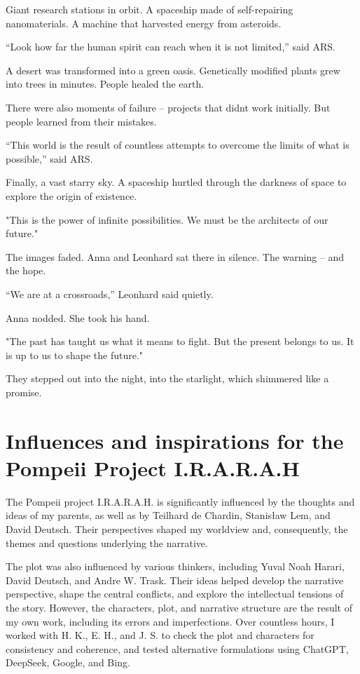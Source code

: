 \documentclass[
]{article}
\begin{document}
Giant research stations in orbit. A spaceship made of self-repairing nanomaterials. A machine that harvested energy from asteroids.

``Look how far the human spirit can reach when it is not limited,'' said ARS.

A desert was transformed into a green oasis. Genetically modified plants grew into trees in minutes. People healed the earth.

There were also moments of failure -- projects that didn\textquotesingle t work initially. But people learned from their mistakes.

``This world is the result of countless attempts to overcome the limits of what is possible,'' said ARS.

Finally, a vast starry sky. A spaceship hurtled through the darkness of space to explore the origin of existence.

"This is the power of infinite possibilities. We must be the architects of our future."

The images faded. Anna and Leonhard sat there in silence. The warning -- and the hope.

``We are at a crossroads,'' Leonhard said quietly.

Anna nodded. She took his hand.

"The past has taught us what it means to fight. But the present belongs to us. It is up to us to shape the future."

They stepped out into the night, into the starlight, which shimmered like a promise.

\section{Influences and inspirations for the Pompeii Project I.R.A.R.A.H}\label{influences-and-inspirations-for-the-pompeii-project-i.r.a.r.a.h}

The Pompeii project I.R.A.R.A.H. is significantly influenced by the thoughts and ideas of my parents, as well as by Teilhard de Chardin, Stanisław Lem, and David Deutsch. Their perspectives shaped my worldview and, consequently, the themes and questions underlying the narrative.

The plot was also influenced by various thinkers, including Yuval Noah Harari, David Deutsch, and Andre W. Trask. Their ideas helped develop the narrative perspective, shape the central conflicts, and explore the intellectual tensions of the story.
However, the characters, plot, and narrative structure are the result of my own work, including its errors and imperfections. Over countless hours, I worked with H. K., E. H., and J. S. to check the plot and characters for consistency and coherence, and tested alternative formulations using ChatGPT, DeepSeek, Google, and Bing.
\end{document}
